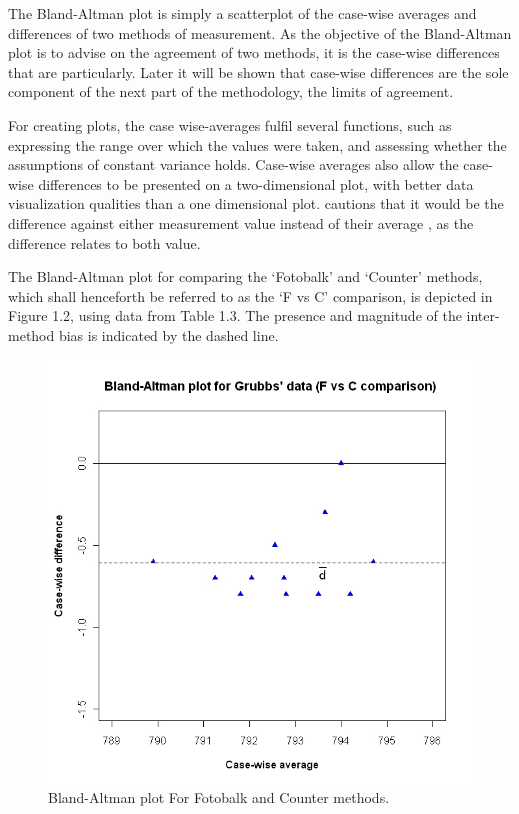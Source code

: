 \documentclass[Main.tex]{subfiles}
\begin{document}
	The Bland-Altman plot is simply a scatterplot of the case-wise
	averages and differences of two methods of measurement. As the
	objective of the Bland-Altman plot is to advise on the agreement
	of two methods, it is the case-wise differences that are
	particularly. Later it will be shown that case-wise differences
	are the sole component of the next part of the methodology, the
	limits of agreement.
	
	For creating plots, the case wise-averages fulfil several
	functions, such as expressing the range over which the values were
	taken, and assessing whether the assumptions of constant variance
	holds. Case-wise averages also allow the case-wise differences to
	be presented on a two-dimensional plot, with better data
	visualization qualities than a one dimensional plot. \citet{BA86}
	cautions that it would be the difference against either
	measurement value instead of their average , as the difference
	relates to both value.
	
	The Bland-Altman plot for comparing the `Fotobalk' and `Counter'
	methods, which shall henceforth be referred to as the `F vs C'
	comparison,  is depicted in Figure 1.2, using data from Table 1.3.
	The presence and magnitude of the inter-method bias is indicated
	by the dashed line.
	
	\begin{figure}[h!]
		\begin{center}
			\includegraphics[width=120mm]{images/GrubbsBAplot-noLOA.jpeg}
			\caption{Bland-Altman plot For Fotobalk and Counter methods.}\label{GrubbsBA-noLOA}
		\end{center}
	\end{figure}
	
\end{document}
